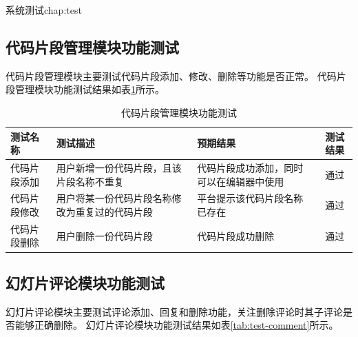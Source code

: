 \begin{cuzchapter}{系统测试}{chap:test}
\begin{enumerate}
    \end{enumerate}
   



  
    \subsection{代码片段管理模块功能测试}
    代码片段管理模块主要测试代码片段添加、修改、删除等功能是否正常。
代码片段管理模块功能测试结果如表\ref{tab:code-comment}所示。
    \begin{table}[htbp]
        \caption{代码片段管理模块功能测试}
        \label{tab:code-comment}
        \centering
        \begin{tabular}{>{\raggedright\arraybackslash}p{2.5cm} >{\raggedright\arraybackslash}p{5.5cm} >{\raggedright\arraybackslash}p{4cm} c}
            \toprule
            测试名称 & 测试描述       & 预期结果          & 测试结果 \\
            \midrule
            代码片段添加 & 用户新增一份代码片段，且该片段名称不重复 & 代码片段成功添加，同时可以在编辑器中使用 & 通过 \\
            \addlinespace
            代码片段修改 & 用户将某一份代码片段名称修改为重复过的代码片段 &  平台提示该代码片段名称已存在  & 通过 \\
            \addlinespace
            代码片段删除 & 用户删除一份代码片段   & 代码片段成功删除 & 通过 \\
            \bottomrule
        \end{tabular}
    \end{table}


    \subsection{幻灯片评论模块功能测试}
    幻灯片评论模块主要测试评论添加、回复和删除功能，关注删除评论时其子评论是否能够正确删除。
    幻灯片评论模块功能测试结果如表\ref{tab:test-comment}所示。


\end{cuzchapter}
